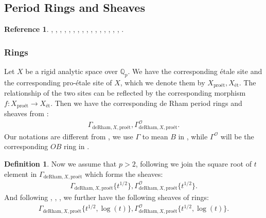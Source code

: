 \documentclass[12pt]{book}
\theoremstyle{definition}
\newtheorem{definition}{Definition}
\newtheorem{reference}{Reference}
\begin{document}
\subsection{Period Rings and Sheaves}


\begin{reference}
\cite{Sch1}, \cite{KL1}, \cite{KL2}, \cite{BL1}, \cite{BL2}, \cite{BS}, \cite{BHS}, \cite{Fon1}, \cite{CS1}, \cite{CS2}, \cite{BK}, \cite{BBK}, \cite{BBBK}, \cite{KKM}, \cite{KM}, \cite{LZ}, \cite{M}.
\end{reference}




\subsubsection{Rings}

\noindent Let $X$ be a rigid analytic space over $\mathbb{Q}_p$. We have the corresponding \'etale site and the corresponding pro-\'etale site of $X$, which we denote them by $X_{\text{pro\'et}},X_\text{\'et}$. The relationship of the two sites can be reflected by the corresponding morphism $f:X_{\text{pro\'et}}\longrightarrow X_\text{\'et}$. Then we have the corresponding de Rham period rings and sheaves from \cite{Sch1}:
\begin{align}
\Gamma_{\text{deRham},X,\text{pro\'et}}, \Gamma^\mathcal{O}_{\text{deRham},X,\text{pro\'et}}.
\end{align}
Our notations are different from \cite{Sch1}, we use $\Gamma$ to mean $B$ in \cite{Sch1}, while $\Gamma^\mathcal{O}$ will be the corresponding $OB$ ring in \cite{Sch1}.\\

\begin{definition}
\indent Now we assume that $p>2$, following \cite{BS} we join the square root of $t$ element in $\Gamma_{\text{deRham},X,\text{pro\'et}}$ which forms the sheaves:
\begin{align}
\Gamma_{\text{deRham},X,\text{pro\'et}}\{t^{1/2}\},\Gamma^\mathcal{O}_{\text{deRham},X,\text{pro\'et}}\{t^{1/2}\}.
\end{align}
And following \cite{BL1}, \cite{BL2}, \cite{Fon1}, \cite{BHS} we further have the following sheaves of rings:
\begin{align}
\Gamma_{\text{deRham},X,\text{pro\'et}}\{t^{1/2},\log(t)\},\Gamma^\mathcal{O}_{\text{deRham},X,\text{pro\'et}}\{t^{1/2},\log(t)\}.
\end{align}
\end{definition}
\end{document}
